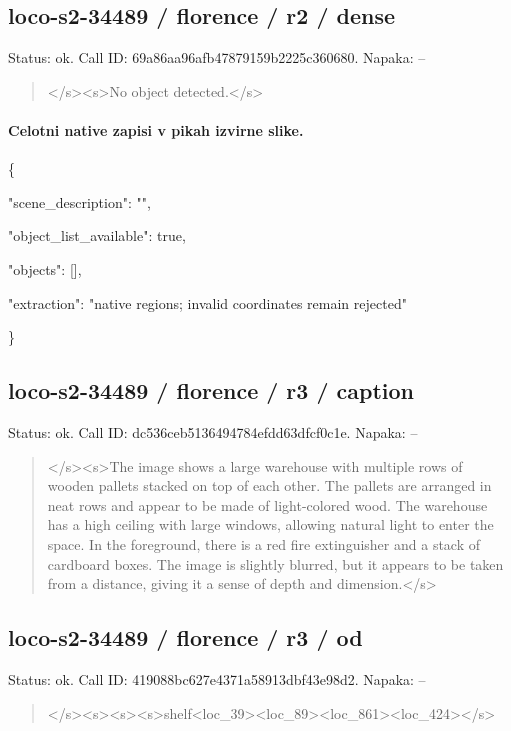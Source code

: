 \documentclass[10pt,a4paper]{article}
\begin{document}
\subsection*{loco-s2-34489 / florence / r2 / dense}
Status: ok. Call ID: 69a86aa96afb47879159b2225c360680. Napaka: --
\begin{quote}\footnotesize
</s>\allowbreak{}<s>\allowbreak{}No object detected.</s>\allowbreak{}
\end{quote}
\paragraph{Celotni native zapisi v pikah izvirne slike.}
\{\par
  "scene\_description":\allowbreak{} "",\allowbreak{}\par
  "object\_list\_available":\allowbreak{} true,\allowbreak{}\par
  "objects":\allowbreak{} [],\allowbreak{}\par
  "extraction":\allowbreak{} "native regions; invalid coordinates remain rejected"\par
\}
\subsection*{loco-s2-34489 / florence / r3 / caption}
Status: ok. Call ID: dc536ceb5136494784efdd63dfcf0c1e. Napaka: --
\begin{quote}\footnotesize
</s>\allowbreak{}<s>\allowbreak{}The image shows a large warehouse with multiple rows of wooden pallets stacked on top of each other. The pallets are arranged in neat rows and appear to be made of light-colored wood. The warehouse has a high ceiling with large windows,\allowbreak{} allowing natural light to enter the space. In the foreground,\allowbreak{} there is a red fire extinguisher and a stack of cardboard boxes. The image is slightly blurred,\allowbreak{} but it appears to be taken from a distance,\allowbreak{} giving it a sense of depth and dimension.</s>\allowbreak{}
\end{quote}
\subsection*{loco-s2-34489 / florence / r3 / od}
Status: ok. Call ID: 419088bc627e4371a58913dbf43e98d2. Napaka: --
\begin{quote}\footnotesize
</s>\allowbreak{}<s>\allowbreak{}<s>\allowbreak{}<s>\allowbreak{}shelf<loc\_39>\allowbreak{}<loc\_8\allowbreak{}9>\allowbreak{}<loc\_861>\allowbreak{}<loc\_424>\allowbreak{}</s>\allowbreak{}
\end{quote}
\end{document}
